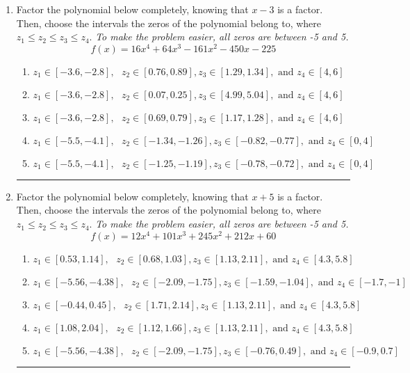 \documentclass[14pt]{extbook}
\newcommand{\litem}[1]{\item#1\hspace*{-1cm}\rule{\textwidth}{0.4pt}}
\begin{document}
\begin{enumerate}
{\begin{enumerate}[label=\Alph*.]
\end{enumerate} }
\litem{
Factor the polynomial below completely, knowing that $x-3$ is a factor. Then, choose the intervals the zeros of the polynomial belong to, where $z_1 \leq z_2 \leq z_3 \leq z_4$. \textit{To make the problem easier, all zeros are between -5 and 5.}\[ f(x) = 16x^{4} +64 x^{3} -161 x^{2} -450 x -225 \]\begin{enumerate}[label=\Alph*.]
\item \( z_1 \in [-3.6, -2.8], \text{   }  z_2 \in [0.76, 0.89], z_3 \in [1.29, 1.34], \text{   and   } z_4 \in [4, 6] \)
\item \( z_1 \in [-3.6, -2.8], \text{   }  z_2 \in [0.07, 0.25], z_3 \in [4.99, 5.04], \text{   and   } z_4 \in [4, 6] \)
\item \( z_1 \in [-3.6, -2.8], \text{   }  z_2 \in [0.69, 0.79], z_3 \in [1.17, 1.28], \text{   and   } z_4 \in [4, 6] \)
\item \( z_1 \in [-5.5, -4.1], \text{   }  z_2 \in [-1.34, -1.26], z_3 \in [-0.82, -0.77], \text{   and   } z_4 \in [0, 4] \)
\item \( z_1 \in [-5.5, -4.1], \text{   }  z_2 \in [-1.25, -1.19], z_3 \in [-0.78, -0.72], \text{   and   } z_4 \in [0, 4] \)

\end{enumerate} }
\litem{
Factor the polynomial below completely, knowing that $x+5$ is a factor. Then, choose the intervals the zeros of the polynomial belong to, where $z_1 \leq z_2 \leq z_3 \leq z_4$. \textit{To make the problem easier, all zeros are between -5 and 5.}\[ f(x) = 12x^{4} +101 x^{3} +245 x^{2} +212 x + 60 \]\begin{enumerate}[label=\Alph*.]
\item \( z_1 \in [0.53, 1.14], \text{   }  z_2 \in [0.68, 1.03], z_3 \in [1.13, 2.11], \text{   and   } z_4 \in [4.3, 5.8] \)
\item \( z_1 \in [-5.56, -4.38], \text{   }  z_2 \in [-2.09, -1.75], z_3 \in [-1.59, -1.04], \text{   and   } z_4 \in [-1.7, -1] \)
\item \( z_1 \in [-0.44, 0.45], \text{   }  z_2 \in [1.71, 2.14], z_3 \in [1.13, 2.11], \text{   and   } z_4 \in [4.3, 5.8] \)
\item \( z_1 \in [1.08, 2.04], \text{   }  z_2 \in [1.12, 1.66], z_3 \in [1.13, 2.11], \text{   and   } z_4 \in [4.3, 5.8] \)
\item \( z_1 \in [-5.56, -4.38], \text{   }  z_2 \in [-2.09, -1.75], z_3 \in [-0.76, 0.49], \text{   and   } z_4 \in [-0.9, 0.7] \)


\end{enumerate}}
\end{enumerate}
\end{document}
